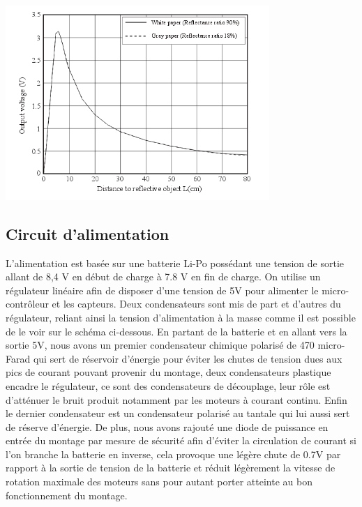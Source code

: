 \documentclass{article}
\begin{document}
\begin{center}
  \includegraphics[width=10cm]{sharp_courbe.png}
\end{center}

\subsection{Circuit d'alimentation}

L'alimentation est basée sur une batterie Li-Po possédant une tension de sortie allant de 8,4 V en début de charge à 7.8 V en fin de charge. On utilise un régulateur linéaire afin de disposer d'une tension de 5V pour alimenter le micro-contrôleur et les capteurs. Deux condensateurs sont mis de part et d'autres du régulateur, reliant ainsi la tension d'alimentation à la masse comme il est possible de le voir sur le schéma ci-dessous. En partant de la batterie et en allant vers la sortie 5V, nous avons un premier condensateur chimique polarisé de 470 micro-Farad qui sert de réservoir d’énergie pour éviter les chutes de tension dues aux pics de courant pouvant provenir du montage, deux condensateurs plastique encadre le régulateur, ce sont des condensateurs de découplage, leur rôle est d’atténuer le bruit produit notamment par les moteurs à courant continu. Enfin le dernier condensateur est un condensateur polarisé au tantale qui lui aussi sert de réserve d'énergie. De plus, nous avons rajouté une diode de puissance en entrée du montage par mesure de sécurité afin d'éviter la circulation de courant si l'on branche la batterie en inverse, cela provoque une légère chute de 0.7V par rapport à la sortie de tension de la batterie et réduit légèrement la vitesse de rotation maximale des moteurs sans pour autant porter atteinte au bon fonctionnement du montage.
\end{document}
